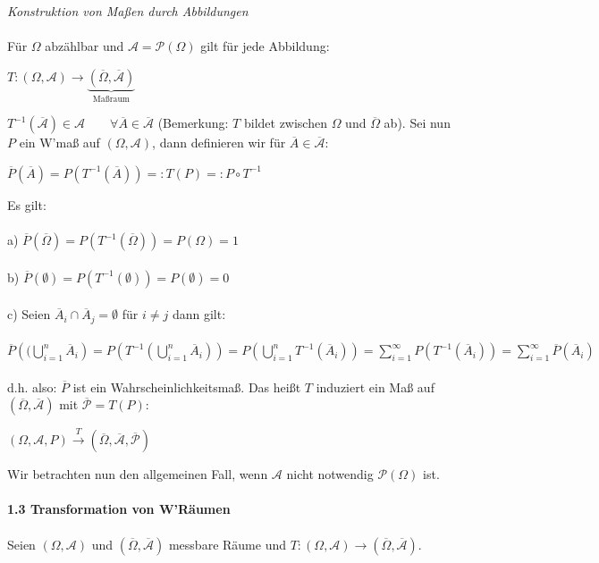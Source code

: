 \documentclass[10pt,a4paper]{report}
\numberwithin{equation}{section}
\numberwithin{figure}{section}
\theoremstyle{plain}
\theoremstyle{definition}
\theoremstyle{plain}
\theoremstyle{definition}
\theoremstyle{remark}
\theoremstyle{plain}
\begin{document}
\textit{Konstruktion von Maßen durch Abbildungen}\\\\
Für $\Omega$ abzählbar und $\mathcal{A}=\mathcal{P}(\Omega)$ gilt für jede Abbildung:\begin{center}
$T:(\Omega,\mathcal{A}) \to \underbrace{(\overline{\Omega},\overline{\mathcal{A}})}_\text{Maßraum}$
\end{center}
$T^{-1}(\overline{\mathcal{A}})\in \mathcal{A} \qquad \forall \overline{A} \in \overline{\mathcal{A}}$ (Bemerkung: $T$ bildet zwischen $\Omega$ und  $\overline{\Omega}$ ab). Sei nun $P$ ein W'maß auf $(\Omega,\mathcal{A})$, dann definieren wir für $\overline{A} \in \overline{\mathcal{A}}$:
\begin{center}
$\overline{P}(\overline{A})=P(T^{-1}(\overline{A}))=:T(P)=:P\circ T^{-1}$
\end{center}
Es gilt:\\\\
a) $\overline{P}(\overline{\Omega})=P(T^{-1}(\overline{\Omega}))=P(\Omega)=1$\\\\
b) $\overline{P}(\emptyset)=P(T^{-1}(\emptyset))=P(\emptyset)=0$\\\\
c) Seien $\overline{A}_i\cap \overline{A}_j=\emptyset$ für $i\neq j$ dann gilt:\\\\ $\overline{P}\left((\bigcup\limits_{i=1}^n \overline{A}_i \right)=P\left(T^{-1}\left(\bigcup\limits_{i=1}^n \overline{A}_i\right)\right)=P\left(\bigcup\limits_{i=1}^n T^{-1}(\overline{A}_i)\right)=\sum\limits_{i=1}^\infty P(T^{-1}(\overline{A}_i))=\sum\limits_{i=1}^\infty \overline{P}(\overline{A}_i)$\\\\
d.h. also: $\overline{P}$ ist ein Wahrscheinlichkeitsmaß. Das heißt $T$ induziert ein Maß auf $(\overline{\Omega},\overline{\mathcal{A}})$ mit $\overline{\mathcal{P}}=T(P)$:
\begin{center}
$(\Omega, \mathcal{A}, P) \overset{T}{\to}(\overline{\Omega},\overline{\mathcal{A}},\overline{\mathcal{P}})$
\end{center}
Wir betrachten nun den allgemeinen Fall, wenn $\mathcal{A}$ nicht notwendig $\mathcal{P}(\Omega)$ ist.\\\\
\Large{\textbf{1.3 Transformation von W'Räumen}}\normalsize\\\\
Seien $(\Omega, \mathcal{A})$ und $(\overline{\Omega},\overline{\mathcal{A}})$ messbare Räume und $T: (\Omega, \mathcal{A}) \to (\overline{\Omega},\overline{\mathcal{A}})$.\\\\
\end{document}
